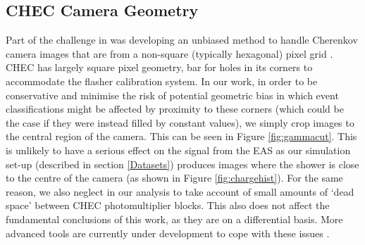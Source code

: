 \begin{table}[ht]
    \centering
    \caption{Summary of methods used. The ordering of input channels into the ConvLSTM2D networks is as presented in this table. The number of trainable parameters is also shown, highlighting the effect of using a different number of channels in method B.}
    \label{table:methods}
\end{table}
\subsection{CHEC Camera Geometry}
Part of the challenge in \cite{Shilon} was developing an unbiased method to handle Cherenkov camera images that are from a non-square (typically hexagonal) pixel grid \cite{Hexagdly}.  CHEC has largely square pixel geometry, bar for holes in its corners to accommodate the flasher calibration system. In our work, in order to be conservative and minimise the risk of potential geometric bias in which event classifications might be affected by proximity to these corners (which could be the case if they were instead filled by constant values), we simply crop images to the central region of the camera. This can be seen in Figure \ref{fig:gammacut}. This is unlikely to have a serious effect on the signal from the EAS as our simulation set-up (described in section \ref{Datasets}) produces images where the shower is close to the centre of the camera (as shown in Figure \ref{fig:chargehist}). For the same reason, we also neglect in our analysis to take account of small amounts of `dead space' between CHEC photomultiplier blocks. This also does not affect the fundamental conclusions of this work, as they are on a differential basis. More advanced tools are currently under development to cope with these issues \cite{dl1dh} \cite{thomas}.

